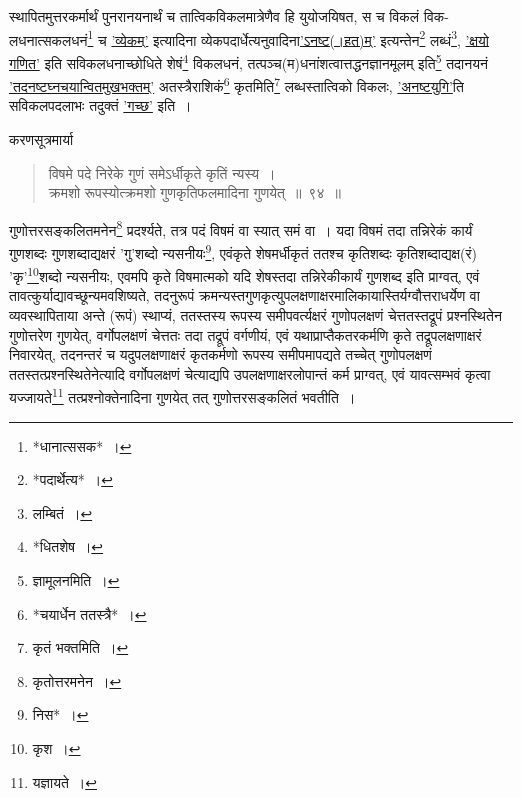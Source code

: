 \documentclass[10pt, openany]{book}
\begin{document}
{{{{{{{{{{{\newpage

{स्थापितमुत्तरकर्मार्थं पुनरानयनार्थं च तात्विकविकलमात्रेणैव हि
युयोजयिषत, स च विकलं}
{विक-लधनात्सकलधनं\renewcommand{\thefootnote}{२}\footnote{*धानात्ससक*~।} च \hyperref[92]{'व्येकम्'} इत्यादिना
व्येकपदार्धेत्यनुवादिना\hyperref[92]{'ऽनष्ट(।हत)म्'} इत्यन्तेन\renewcommand{\thefootnote}{३}\footnote{*पदार्थेत्य*~।} लब्धं\renewcommand{\thefootnote}{४}\footnote{लम्बितं~।},}
{\hyperref[92]{'क्षयो गणित'} इति सविकलधनाच्छोधिते शेषं\renewcommand{\thefootnote}{५}\footnote{*धितशेष~।} विकलधनं,
तत्पञ्च(म)धनांशत्वात्तद्धनज्ञानमूलम् इति\renewcommand{\thefootnote}{६}\footnote{ज्ञामूलनमिति~।} तदानयनं \hyperref[92]{'तदनष्टघ्नचयान्वितमुखभक्तम्'} अतस्त्रैराशिकं\renewcommand{\thefootnote}{७}\footnote{*चयार्धेन ततस्त्रै*~।}
कृतमिति\renewcommand{\thefootnote}{८}\footnote{कृतं भक्तमिति~।} लब्धस्तात्विको}
{विकलः, \hyperref[92]{'अनष्टयुगि'}ति सविकलपदलाभः तदुक्तं \hyperref[92]{'गच्छ'} इति~।}
\vspace{3mm}

{करणसूत्रमार्या\textendash}

 \label{94}
\begin{quote}
    
{\bs विषमे पदे निरेके गुणं समेऽर्धीकृते कृतिं न्यस्य~।\\
 क्रमशो रूपस्योत्क्रमशो गुणकृतिफलमादिना गुणयेत्~॥~९४~॥}\end{quote}

{गुणोत्तरसङ्कलितमनेन\renewcommand{\thefootnote}{९}\footnote{कृतोत्तरमनेन~।} प्रदर्श्यते, तत्र पदं विषमं वा स्यात् समं वा~। यदा विषमं तदा}
{तन्निरेकं कार्यं गुणशब्दः गुणशब्दाद्यक्षरं 'गु'शब्दो न्यसनीयः\renewcommand{\thefootnote}{१०}\footnote{निस*~।},
एवंकृते शेषमर्धीकृतं ततश्च}
{कृतिशब्दः कृतिशब्दाद्यक्ष(रं) 'कृ'\renewcommand{\thefootnote}{११}\footnote{कृश~।}शब्दो न्यसनीयः, एवमपि कृते
विषमात्मको यदि शेषस्तदा}
{तन्निरेकीकार्यं गुणशब्द इति प्राग्वत्, एवं
तावत्कुर्याद्यावच्छून्यमवशिष्यते, तदनुरूपं क्रमन्यस्तगुणकृत्युपलक्षणाक्षरमालिकायास्तिर्यग्वौत्तराधर्येण वा व्यवस्थापिताया अन्ते
(रूपं) स्थाप्यं, ततस्तस्य}
{रूपस्य समीपवर्त्यक्षरं गुणोपलक्षणं चेत्ततस्तद्रूपं प्रश्नस्थितेन
गुणोत्तरेण गुणयेत्, वर्गोपलक्षणं}
{चेत्ततः तदा तद्रूपं वर्गणीयं, एवं यथाप्राप्तैकतरकर्मणि कृते
तद्रूपलक्षणाक्षरं निवारयेत्,}
{तदनन्तरं च यदुपलक्षणाक्षरं कृतकर्मणो रूपस्य समीपमापद्यते तच्चेत्
गुणोपलक्षणं}
{ततस्तत्प्रश्नस्थितेनेत्यादि वर्गोपलक्षणं चेत्याद्यपि
उपलक्षणाक्षरलोपान्तं कर्म प्राग्वत्, एवं}
{यावत्सम्भवं कृत्वा यज्जायते\renewcommand{\thefootnote}{१२}\footnote{यज्ञायते~।} तत्प्रश्नोक्तेनादिना गुणयेत् तत्
गुणोत्तरसङ्कलितं भवतीति~।}
\vspace{3mm}

}}}}}}}}}}}
\end{document}
